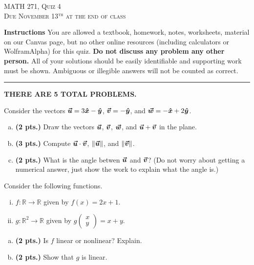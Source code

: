 \documentclass[12pt]{amsbook}
\newcommand{\R}{\mathbb{R}}
\begin{document}

\begin{center}
   \textsc{\large MATH 271, Quiz 4}\\
   \textsc{Due November 13$^\textrm{th}$ at the end of class}
\end{center}

\vspace{1cm}

\noindent\textbf{Instructions} \; You are allowed a textbook, homework, notes, worksheets, material on our Canvas page, but no other online resources (including calculators or WolframAlpha) for this quiz.  \textbf{Do not discuss any problem any other person.} All of your solutions should be easily identifiable and supporting work must be shown.  Ambiguous or illegible answers will not be counted as correct.


\vspace*{.5cm}
\hrule
\vspace*{.5cm}

\begin{center}\textbf{\large THERE ARE 5 TOTAL PROBLEMS.}\normalsize \end{center}

\begin{problem} Consider the vectors $\boldsymbol{\boldsymbol{\vec{u}}} = 3\boldsymbol{\hat{x}} -\boldsymbol{\hat{y}}$, $\boldsymbol{\boldsymbol{\vec{v}}} = -\boldsymbol{\hat{y}}$, and $\boldsymbol{\boldsymbol{\vec{w}}} = -\boldsymbol{\hat{x}} + 2\boldsymbol{\hat{y}}$.
\begin{enumerate}[(a)]
    \item \textbf{(2 pts.)} Draw the vectors $\boldsymbol{\boldsymbol{\vec{u}}}$, $\boldsymbol{\boldsymbol{\vec{v}}}$, $\boldsymbol{\boldsymbol{\vec{w}}}$, and $\boldsymbol{\boldsymbol{\vec{u}}}+\boldsymbol{\boldsymbol{\vec{v}}}$ in the plane.
    \item \textbf{(3 pts.)} Compute $\boldsymbol{\boldsymbol{\vec{u}}} \cdot \boldsymbol{\boldsymbol{\vec{v}}}$, $\|\boldsymbol{\boldsymbol{\vec{u}}}\|$, and $\|\boldsymbol{\boldsymbol{\vec{v}}}\|$.
    \item \textbf{(2 pts.)} What is the angle betwen $\boldsymbol{\boldsymbol{\vec{u}}}$ and $\boldsymbol{\boldsymbol{\vec{v}}}$? (Do not worry about getting a numerical answer, just show the work to explain what the angle is.)
\end{enumerate}
\end{problem}

\begin{problem}
Consider the following functions.
\begin{enumerate}[i.]
    \item $f\colon \R \to \R$ given by $f(x)=2x+1$.
    \item $g\colon \R^2 \to \R$ given by $g\begin{pmatrix} x \\ y \end{pmatrix} = x+y$.
\end{enumerate}
\begin{enumerate}[(a)]
    \item \textbf{(2 pts.)} Is $f$ linear or nonlinear? Explain.
    \item \textbf{(2 pts.)} Show that $g$ is linear.
\end{enumerate}
\end{problem}
\end{document}
